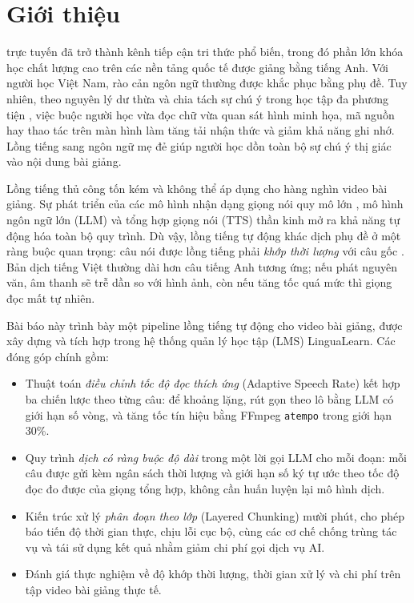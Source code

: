 \documentclass{IEEEtran}
\begin{document}
\section{Giới thiệu}
\label{sec:introduction}
 trực tuyến đã trở thành kênh tiếp cận tri thức phổ biến, trong đó phần lớn khóa học chất lượng cao trên các nền tảng quốc tế được giảng bằng tiếng Anh. Với người học Việt Nam, rào cản ngôn ngữ thường được khắc phục bằng phụ đề. Tuy nhiên, theo nguyên lý dư thừa và chia tách sự chú ý trong học tập đa phương tiện \cite{mayer2009,kalyuga1999}, việc buộc người học vừa đọc chữ vừa quan sát hình minh họa, mã nguồn hay thao tác trên màn hình làm tăng tải nhận thức và giảm khả năng ghi nhớ. Lồng tiếng sang ngôn ngữ mẹ đẻ giúp người học dồn toàn bộ sự chú ý thị giác vào nội dung bài giảng.

Lồng tiếng thủ công tốn kém và không thể áp dụng cho hàng nghìn video bài giảng. Sự phát triển của các mô hình nhận dạng giọng nói quy mô lớn \cite{radford2023whisper}, mô hình ngôn ngữ lớn (LLM) \cite{gemini2023} và tổng hợp giọng nói (TTS) thần kinh mở ra khả năng tự động hóa toàn bộ quy trình. Dù vậy, lồng tiếng tự động khác dịch phụ đề ở một ràng buộc quan trọng: câu nói được lồng tiếng phải \emph{khớp thời lượng} với câu gốc \cite{federico2020,brannon2023}. Bản dịch tiếng Việt thường dài hơn câu tiếng Anh tương ứng; nếu phát nguyên văn, âm thanh sẽ trễ dần so với hình ảnh, còn nếu tăng tốc quá mức thì giọng đọc mất tự nhiên.

Bài báo này trình bày một pipeline lồng tiếng tự động cho video bài giảng, được xây dựng và tích hợp trong hệ thống quản lý học tập (LMS) LinguaLearn. Các đóng góp chính gồm:
\begin{itemize}
\item Thuật toán \emph{điều chỉnh tốc độ đọc thích ứng} (Adaptive Speech Rate) kết hợp ba chiến lược theo từng câu: để khoảng lặng, rút gọn theo lô bằng LLM có giới hạn số vòng, và tăng tốc tín hiệu bằng FFmpeg \texttt{atempo} trong giới hạn 30\%.
\item Quy trình \emph{dịch có ràng buộc độ dài} trong một lời gọi LLM cho mỗi đoạn: mỗi câu được gửi kèm ngân sách thời lượng và giới hạn số ký tự ước theo tốc độ đọc đo được của giọng tổng hợp, không cần huấn luyện lại mô hình dịch.
\item Kiến trúc xử lý \emph{phân đoạn theo lớp} (Layered Chunking) mười phút, cho phép báo tiến độ thời gian thực, chịu lỗi cục bộ, cùng các cơ chế chống trùng tác vụ và tái sử dụng kết quả nhằm giảm chi phí gọi dịch vụ AI.
\item Đánh giá thực nghiệm về độ khớp thời lượng, thời gian xử lý và chi phí trên tập video bài giảng thực tế.
\end{itemize}
\end{document}
